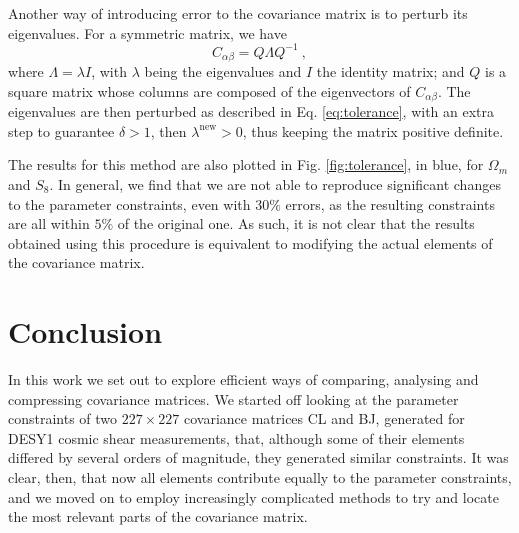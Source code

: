 \documentclass[twocolumn]{\docclass}
\newcommand{\rf}[1]{\ref{fig:#1}}
\newcommand\be{\begin{equation}}
\newcommand\ee{\end{equation}}
\begin{document}
	Another way of introducing error to the covariance matrix is to perturb its eigenvalues. For a symmetric matrix, we have
	\be
	C_{\alpha \beta} = Q\Lambda Q^{-1}\ ,
	\ee
	where $\Lambda = \lambda I$, with $\lambda$ being the eigenvalues and $I$ the identity matrix; and $Q$ is a square matrix whose columns are composed of the eigenvectors of $C_{\alpha \beta}$. The eigenvalues are then perturbed as described in Eq. \ref{eq:tolerance}, with an extra step to guarantee $\delta > 1$, then $\lambda^{\mathrm{new}} > 0$, thus keeping the matrix positive definite.
	
	The results for this method are also plotted in Fig. \rf{tolerance}, in blue, for $\Omega_m$ and $S_8$. In general, we find that we are not able to reproduce significant changes to the parameter constraints, even with $30\%$ errors, as the resulting constraints are all within $5\%$ of the original one. As such, it is not clear that the results obtained using this procedure is equivalent to modifying the actual elements of the covariance matrix. 
	
	
	
	
	
	
	
	
	\section{Conclusion}
	\label{sec:conclusion}
	
	In this work we set out to explore efficient ways of comparing, analysing and compressing covariance matrices. We started off looking at the parameter constraints of two $227 \times 227$ covariance matrices CL and BJ, generated for DESY1 cosmic shear measurements, that, although some of their elements differed by several orders of magnitude, they generated similar constraints. It was clear, then, that now all elements contribute equally to the parameter constraints, and we moved on to employ increasingly complicated methods to try and locate the most relevant parts of the covariance matrix.
	
\end{document}
